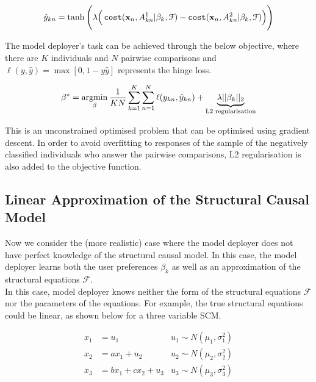 \begin{equation} \label{eq:yhat_relaxation}
	\hat{y}_{kn} = \tanh \Bigg(\lambda \Big(\operatorname*{\texttt{cost}}(\mathbf{x}_n, A^1_{kn}|\beta_k, \mathcal{F}) - \operatorname*{\texttt{cost}}(\mathbf{x}_n, A^2_{kn}|\beta_k, \mathcal{F})\Big)\Bigg)
\end{equation}

The model deployer's task can be achieved through the below objective, where there are $K$ individuals and $N$ pairwise comparisons and $\ell(y, \hat{y}) = \max[0, 1-y\hat{y}]$ represents the hinge loss.

\begin{equation}
	\beta^* = \operatorname*{argmin}_\beta \frac{1}{KN} \sum_{k=1}^K \sum_{n=1}^N \ell (y_{kn}, \hat{y}_{kn}) + \underbrace{\lambda ||\beta_k||_2}_{\text{L2 regularisation}}
\end{equation}

This is an unconstrained optimised problem that can be optimised using gradient descent. In order to avoid overfitting to responses of the sample of the negatively classified individuals who answer the pairwise comparisons, L2 regularisation is also added to the objective function.

\subsection{Linear Approximation of the Structural Causal Model}

Now we consider the (more realistic) case where the model deployer does not have perfect knowledge of the structural causal model. In this case, the model deployer learns both the user preferences $\beta_k$ as well as an approximation of the structural equations $\mathcal{F}$.\\


In this case, model deployer knows neither the form of the structural equations $\mathcal{F}$ nor the parameters of the equations. For example, the true structural equations could be linear, as shown below for a three variable SCM.

\begin{align} \label{eq:linear_scm_example}
	x_1 & = u_1 & u_1 \sim N(\mu_1,\sigma_1^2) \\ \nonumber
	x_2 & = ax_1 + u_2 & u_2 \sim N(\mu_2,\sigma_2^2) \\ \nonumber
	x_3 & = bx_1 + cx_2 + u_3 & u_3 \sim N(\mu_3,\sigma_3^2) \\ \nonumber
\end{align}

